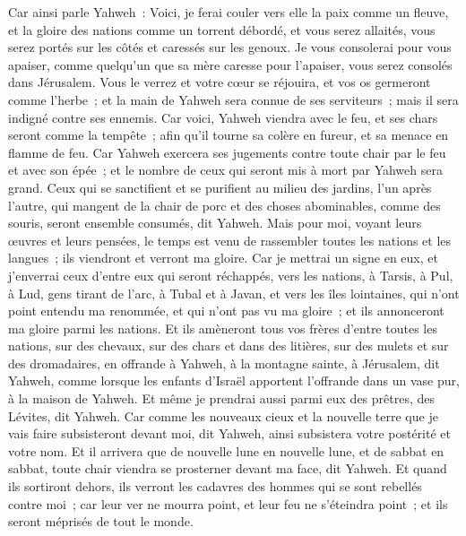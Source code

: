 \begin{multicols}{2}
Car ainsi parle Yahweh~: Voici, je ferai couler vers elle la paix comme un fleuve, et la gloire des nations comme un torrent débordé, et vous serez allaités, vous serez portés sur les côtés et caressés sur les genoux.
Je vous consolerai pour vous apaiser, comme quelqu'un que sa mère caresse pour l'apaiser, vous serez consolés dans Jérusalem.
Vous le verrez et votre cœur se réjouira, et vos os germeront comme l'herbe~; et la main de Yahweh sera connue de ses serviteurs~; mais il sera indigné contre ses ennemis.
Car voici, Yahweh viendra avec le feu, et ses chars seront comme la tempête~; afin qu'il tourne sa colère en fureur, et sa menace en flamme de feu.
Car Yahweh exercera ses jugements contre toute chair par le feu et avec son épée~; et le nombre de ceux qui seront mis à mort par Yahweh sera grand.
Ceux qui se sanctifient et se purifient au milieu des jardins, l'un après l'autre, qui mangent de la chair de porc et des choses abominables, comme des souris, seront ensemble consumés, dit Yahweh.
Mais pour moi, voyant leurs œuvres et leurs pensées, le temps est venu de rassembler toutes les nations et les langues~; ils viendront et verront ma gloire.
Car je mettrai un signe en eux, et j'enverrai ceux d'entre eux qui seront réchappés, vers les nations, à Tarsis, à Pul, à Lud, gens tirant de l'arc, à Tubal et à Javan, et vers les îles lointaines, qui n'ont point entendu ma renommée, et qui n'ont pas vu ma gloire~; et ils annonceront ma gloire parmi les nations.
Et ils amèneront tous vos frères d'entre toutes les nations, sur des chevaux, sur des chars et dans des litières, sur des mulets et sur des dromadaires, en offrande à Yahweh, à la montagne sainte, à Jérusalem, dit Yahweh, comme lorsque les enfants d'Israël apportent l'offrande dans un vase pur, à la maison de Yahweh.
Et même je prendrai aussi parmi eux des prêtres, des Lévites, dit Yahweh.
Car comme les nouveaux cieux et la nouvelle terre que je vais faire subsisteront devant moi, dit Yahweh, ainsi subsistera votre postérité et votre nom.
Et il arrivera que de nouvelle lune en nouvelle lune, et de sabbat en sabbat, toute chair viendra se prosterner devant ma face, dit Yahweh.
Et quand ils sortiront dehors, ils verront les cadavres des hommes qui se sont rebellés contre moi~; car leur ver ne mourra point, et leur feu ne s'éteindra point~; et ils seront méprisés de tout le monde.
\PPE{}
\end{multicols}
